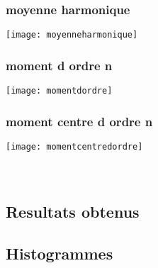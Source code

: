 \documentclass[a4paper,12pt,reqno]{article}
\newcommand{\newparagraphe}[1]{\paragraph{#1}\mbox{}\\}
\begin{document}
\subsubsection{moyenne harmonique}
\texttt{[image: moyenneharmonique]}\\

\subsubsection{moment d ordre n}
\texttt{[image: momentdordre]}\\

\subsubsection{moment centre d ordre n}
\texttt{[image: momentcentredordre]}\\

\newparagraphe{}
\subsection{Resultats obtenus}


\subsection{Histogrammes}
\end{document}
